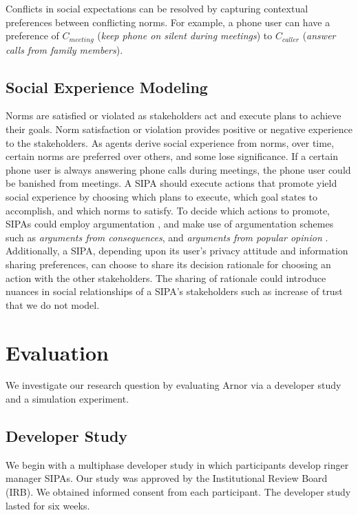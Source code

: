 \documentclass[11pt,          %
               phd,           %
               onehalfspacing %
               ]{ncsuthesis}
\newcommand{\fsl}{\textsl}
\newcommand{\frameworkA}{Arnor\xspace}
\begin{document}
Conflicts in social expectations can be resolved by capturing contextual 
preferences between conflicting norms. For example, a phone user can have a 
preference of  $C_{meeting}$ (\fsl{keep phone on silent during meetings})
to $C_{caller}$ (\fsl{answer calls from family members}). 

\subsection{Social Experience Modeling}
Norms are satisfied or violated as stakeholders act and execute plans to
achieve their goals. Norm satisfaction or violation provides positive or
negative experience to the stakeholders. As agents derive social
experience from norms, over time, certain norms are preferred over
others, and some lose significance. If a certain phone user is always
answering phone calls during meetings, the phone user could be banished
from meetings. A SIPA should execute actions that promote yield social
experience by choosing which plans to execute, which goal states to
accomplish, and which norms to satisfy. To decide which actions to
promote, SIPAs could employ argumentation
\citep{BenchCapon-2007-Argumentation+AI}, and make use of argumentation
schemes such as \emph{arguments from consequences}, and \emph{arguments
from popular opinion} \citep{walton2008argumentation}. Additionally, a
SIPA, depending upon its user's privacy attitude and information sharing
preferences, can choose to share its decision rationale for choosing an
action with the other stakeholders. The sharing of rationale could
introduce nuances in social relationships of a SIPA's stakeholders such
as increase of trust that we do not model.



\section{Evaluation}
\label{sec:arnor-experiments}

We investigate our research question by evaluating \frameworkA via a
developer study and a simulation experiment.


\subsection{Developer Study}
\label{sec:devstudy}

We begin with a multiphase developer study in
which participants develop ringer manager SIPAs. Our study was approved
by the Institutional Review Board (IRB). We obtained informed consent
from each participant. The developer study lasted for six weeks.
\end{document}
